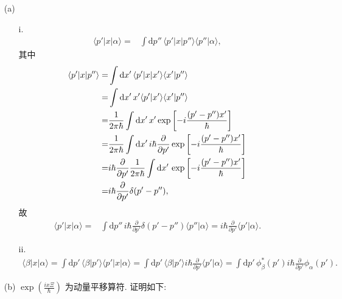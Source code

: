 \documentclass{assignment}
\begin{document}
\begin{pf}
    \begin{itemize}
        \item[(a)] 
        \begin{itemize}
            \item[i.] 
            \begin{align}
                \langle p'\rvert x\lvert\alpha\rangle=&\int\mathrm{d}p''\,\langle p'\rvert x\lvert p''\rangle\langle p''\vert\alpha\rangle,
            \end{align}
            其中
            \begin{align}
                \notag\langle p'\rvert x\lvert p''\rangle=&\int\mathrm{d}x'\,\langle p'\rvert x\lvert x'\rangle\langle x'\vert p''\rangle\\
                \notag=&\int\mathrm{d}x'\,x'\langle p'\vert x'\rangle\langle x'\vert p''\rangle\\
                \notag=&\frac{1}{2\pi\hbar}\int\mathrm{d}x'\,x'\exp\left[-i\frac{(p'-p'')x'}{\hbar}\right]\\
                \notag=&\frac{1}{2\pi\hbar}\int\mathrm{d}x'\,i\hbar\frac{\partial}{\partial p'}\exp\left[-i\frac{(p'-p'')x'}{\hbar}\right]\\
                \notag=&i\hbar\frac{\partial}{\partial p'}\frac{1}{2\pi\hbar}\int\mathrm{d}x'\,\exp\left[-i\frac{(p'-p'')x'}{\hbar}\right]\\
                =&i\hbar\frac{\partial}{\partial p'}\delta(p'-p''),
            \end{align}
            故
            \begin{align}
                \langle p'\rvert x\lvert\alpha\rangle=&\int\mathrm{d}p''\,i\hbar\frac{\partial}{\partial p'}\delta(p'-p'')\langle p''\vert\alpha\rangle=i\hbar\frac{\partial}{\partial p'}\langle p'\vert\alpha\rangle.
            \end{align}
            \item[ii.] 
            \begin{align}
                \langle\beta\rvert x\lvert\alpha\rangle=\int\mathrm{d}p'\,\langle\beta\vert p'\rangle\langle p'\rvert x\lvert\alpha\rangle=\int\mathrm{d}p'\,\langle\beta\vert p'\rangle i\hbar\frac{\partial}{\partial p'}\langle p'\vert\alpha\rangle=\int\mathrm{d}p'\,\phi_{\beta}^*(p')i\hbar\frac{\partial}{\partial p'}\phi_{\alpha}(p').
            \end{align}
        \end{itemize}
        \item[(b)] $\exp\left(\frac{ix\Xi}{\hbar}\right)$ 为动量平移算符. 证明如下:\\

\end{itemize}
\end{pf}
\end{document}
